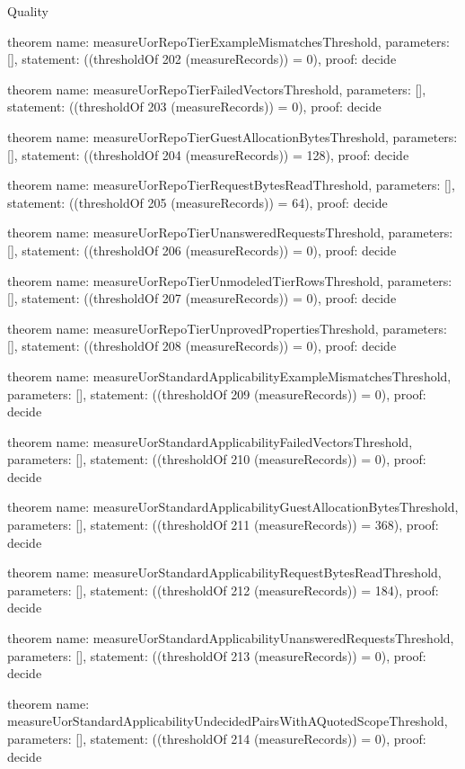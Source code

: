 \begin{lexlean}{Quality}
\begin{semanticmodule}
theorem{
  name: measureUorRepoTierExampleMismatchesThreshold,
  parameters: [],
  statement: ((thresholdOf 202 (measureRecords)) = 0),
  proof: decide{}
}

theorem{
  name: measureUorRepoTierFailedVectorsThreshold,
  parameters: [],
  statement: ((thresholdOf 203 (measureRecords)) = 0),
  proof: decide{}
}

theorem{
  name: measureUorRepoTierGuestAllocationBytesThreshold,
  parameters: [],
  statement: ((thresholdOf 204 (measureRecords)) = 128),
  proof: decide{}
}

theorem{
  name: measureUorRepoTierRequestBytesReadThreshold,
  parameters: [],
  statement: ((thresholdOf 205 (measureRecords)) = 64),
  proof: decide{}
}

theorem{
  name: measureUorRepoTierUnansweredRequestsThreshold,
  parameters: [],
  statement: ((thresholdOf 206 (measureRecords)) = 0),
  proof: decide{}
}

theorem{
  name: measureUorRepoTierUnmodeledTierRowsThreshold,
  parameters: [],
  statement: ((thresholdOf 207 (measureRecords)) = 0),
  proof: decide{}
}

theorem{
  name: measureUorRepoTierUnprovedPropertiesThreshold,
  parameters: [],
  statement: ((thresholdOf 208 (measureRecords)) = 0),
  proof: decide{}
}

theorem{
  name: measureUorStandardApplicabilityExampleMismatchesThreshold,
  parameters: [],
  statement: ((thresholdOf 209 (measureRecords)) = 0),
  proof: decide{}
}

theorem{
  name: measureUorStandardApplicabilityFailedVectorsThreshold,
  parameters: [],
  statement: ((thresholdOf 210 (measureRecords)) = 0),
  proof: decide{}
}

theorem{
  name: measureUorStandardApplicabilityGuestAllocationBytesThreshold,
  parameters: [],
  statement: ((thresholdOf 211 (measureRecords)) = 368),
  proof: decide{}
}

theorem{
  name: measureUorStandardApplicabilityRequestBytesReadThreshold,
  parameters: [],
  statement: ((thresholdOf 212 (measureRecords)) = 184),
  proof: decide{}
}

theorem{
  name: measureUorStandardApplicabilityUnansweredRequestsThreshold,
  parameters: [],
  statement: ((thresholdOf 213 (measureRecords)) = 0),
  proof: decide{}
}

theorem{
  name: measureUorStandardApplicabilityUndecidedPairsWithAQuotedScopeThreshold,
  parameters: [],
  statement: ((thresholdOf 214 (measureRecords)) = 0),
  proof: decide{}
}


\end{semanticmodule}
\end{lexlean}
